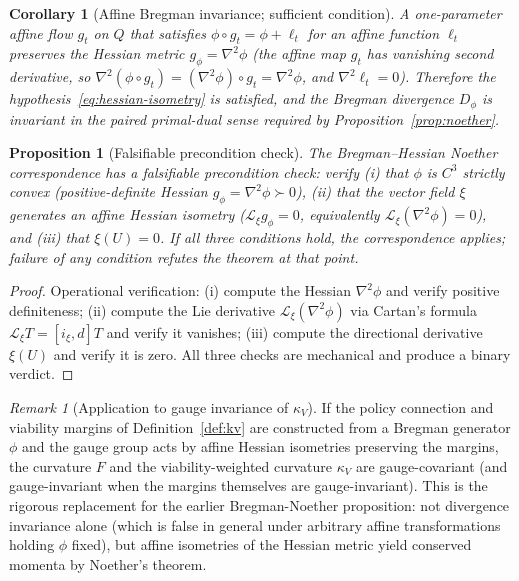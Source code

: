 \documentclass[11pt,a4paper]{article}
\theoremstyle{plain}
\newtheorem{proposition}[theorem]{Proposition}
\newtheorem{corollary}[theorem]{Corollary}
\theoremstyle{definition}
\theoremstyle{remark}
\newtheorem{remark}[theorem]{Remark}
\newcommand{\kk}{\kappa_{\!V}}
\begin{document}
\begin{corollary}[Affine Bregman invariance; sufficient condition]
\label{cor:affine-bregman}
A one-parameter affine flow $g_t$ on $Q$ that satisfies
$\phi \circ g_t = \phi + \ell_t$ for an affine function $\ell_t$
preserves the Hessian metric $g_\phi = \nabla^2 \phi$ (the affine
map $g_t$ has vanishing second derivative, so
$\nabla^2(\phi \circ g_t) = (\nabla^2\phi)\circ g_t = \nabla^2\phi$,
and $\nabla^2 \ell_t = 0$). Therefore the
hypothesis~\eqref{eq:hessian-isometry} is satisfied, and the Bregman
divergence $D_\phi$ is invariant in the paired primal-dual sense
required by Proposition~\ref{prop:noether}.
\end{corollary}

\begin{proposition}[Falsifiable precondition check]
\label{prop:noether-precondition}
The Bregman--Hessian Noether correspondence has a falsifiable
precondition check: verify (i) that $\phi$ is $C^3$ strictly convex
(positive-definite Hessian $g_\phi = \nabla^2 \phi \succ 0$), (ii)
that the vector field $\xi$ generates an affine Hessian isometry
($\mathcal L_\xi g_\phi = 0$, equivalently $\mathcal L_\xi
(\nabla^2 \phi) = 0$), and (iii) that $\xi(U) = 0$. If all three
conditions hold, the correspondence applies; failure of any condition
refutes the theorem at that point.
\end{proposition}

\begin{proof}
Operational verification: (i) compute the Hessian $\nabla^2 \phi$ and
verify positive definiteness; (ii) compute the Lie derivative
$\mathcal L_\xi (\nabla^2 \phi)$ via Cartan's formula
$\mathcal L_\xi T = [i_\xi, d] T$ and verify it vanishes; (iii) compute
the directional derivative $\xi(U)$ and verify it is zero. All three
checks are mechanical and produce a binary verdict.
\end{proof}

\begin{remark}[Application to gauge invariance of $\kk$]
If the policy connection and viability margins of
Definition~\ref{def:kv} are constructed from a Bregman
generator $\phi$ and the gauge group acts by affine Hessian isometries
preserving the margins, the curvature $F$ and the viability-weighted
curvature $\kk$ are gauge-covariant (and gauge-invariant when the
margins themselves are gauge-invariant). This is the rigorous
replacement for the earlier Bregman-Noether proposition: not divergence
invariance alone (which is false in general under arbitrary affine
transformations holding $\phi$ fixed), but affine isometries of the
Hessian metric yield conserved momenta by Noether's theorem.
\end{remark}
\end{document}
